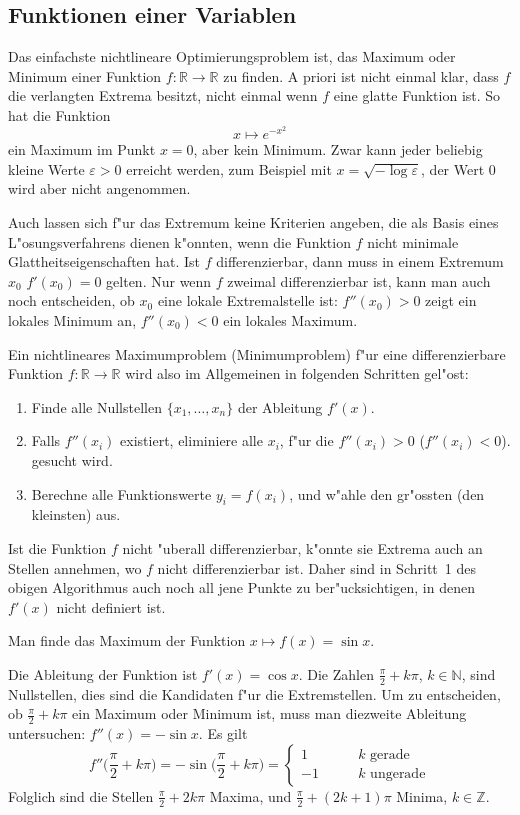 \subsection{Funktionen einer Variablen\label{nlp:extremwerte:einevariable}}
Das einfachste nichtlineare Optimierungsproblem ist, das Maximum
oder Minimum einer Funktion $f\colon\mathbb R\to\mathbb R$ zu finden.
A priori ist nicht einmal klar, dass $f$ die verlangten Extrema
besitzt, nicht einmal wenn $f$ eine glatte Funktion ist. So hat
die Funktion
\[
x\mapsto e^{-x^2}
\]
ein Maximum im Punkt $x=0$, aber kein Minimum. Zwar kann jeder beliebig
kleine Werte $\varepsilon>0$ erreicht werden, zum Beispiel mit
$x=\sqrt{-\log \varepsilon}$, der Wert $0$ wird aber nicht angenommen.

Auch lassen sich f"ur das Extremum keine Kriterien angeben, die 
als Basis eines L"osungsverfahrens dienen k"onnten, wenn die Funktion
$f$ nicht minimale Glattheitseigenschaften hat.
Ist $f$ differenzierbar, dann muss in einem Extremum $x_0$
$f'(x_0)=0$ gelten. Nur wenn $f$ zweimal differenzierbar ist,
kann man auch noch entscheiden, ob $x_0$ eine lokale Extremalstelle
ist: $f''(x_0)>0$ zeigt ein lokales Minimum an, $f''(x_0) < 0$
ein lokales Maximum.

Ein nichtlineares Maximumproblem (Minimumproblem) f"ur eine differenzierbare
Funktion $f\colon\mathbb R\to\mathbb R$ wird also im Allgemeinen in
folgenden Schritten gel"ost:
\begin{enumerate}
\item Finde alle Nullstellen $\{x_1,\dots,x_n\}$ der Ableitung $f'(x)$.
\item Falls $f''(x_i)$ existiert, eliminiere alle $x_i$, f"ur die
$f''(x_i) > 0$ ($f''(x_i) < 0$).
gesucht wird.
\item Berechne alle Funktionswerte $y_i=f(x_i)$, und w"ahle den
gr"ossten (den kleinsten) aus.
\end{enumerate}

Ist die Funktion $f$ nicht "uberall differenzierbar, k"onnte sie Extrema
auch an Stellen annehmen, wo $f$ nicht differenzierbar ist. Daher
sind in Schritt~1 des obigen Algorithmus auch noch all jene Punkte
zu ber"ucksichtigen, in denen $f'(x)$ nicht definiert ist.

\begin{beispiel} Man finde das Maximum der Funktion $x\mapsto f(x)=\sin x$.
\bigskip

Die Ableitung der Funktion ist $f'(x)=\cos x$.
Die Zahlen $\frac{\pi}2+k\pi$, $k\in\mathbb N$, 
sind Nullstellen, dies sind die Kandidaten f"ur die Extremstellen.
Um zu entscheiden, ob $\frac{\pi}2+k\pi$ ein Maximum oder Minimum ist, muss
man diezweite Ableitung untersuchen: $f''(x)=-\sin x$. Es gilt
\[
f''\biggl(\frac{\pi}2+k\pi\biggr)
=
-\sin\biggl(\frac{\pi}2+ k\pi\biggr)
=\begin{cases}
1&\qquad \text{$k$ gerade}\\
-1&\qquad\text{$k$ ungerade}
\end{cases}
\]
Folglich sind die Stellen $\frac{\pi}2+2k\pi$ Maxima, und
$\frac{\pi}2+(2k+1)\pi$ Minima, $k\in\mathbb Z$.
\end{beispiel}


